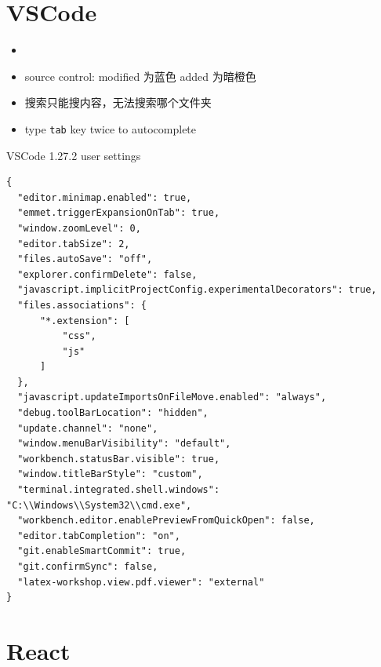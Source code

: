 \documentclass[a4paper, 12pt]{article}
\begin{document}
\section{VSCode}
\begin{itemize}

\item 

\item source control: modified 为蓝色 \quad added 为暗橙色

\item 搜索只能搜内容，无法搜索哪个文件夹

\item type \verb|tab| key twice to autocomplete
\end{itemize}

VSCode 1.27.2 user settings
\begin{verbatim}
{
  "editor.minimap.enabled": true,
  "emmet.triggerExpansionOnTab": true,
  "window.zoomLevel": 0,
  "editor.tabSize": 2,
  "files.autoSave": "off",
  "explorer.confirmDelete": false,
  "javascript.implicitProjectConfig.experimentalDecorators": true,
  "files.associations": {
      "*.extension": [
          "css",
          "js"
      ]
  },
  "javascript.updateImportsOnFileMove.enabled": "always",
  "debug.toolBarLocation": "hidden",
  "update.channel": "none",
  "window.menuBarVisibility": "default",
  "workbench.statusBar.visible": true,
  "window.titleBarStyle": "custom",
  "terminal.integrated.shell.windows": "C:\\Windows\\System32\\cmd.exe",
  "workbench.editor.enablePreviewFromQuickOpen": false,
  "editor.tabCompletion": "on",
  "git.enableSmartCommit": true,
  "git.confirmSync": false,
  "latex-workshop.view.pdf.viewer": "external"
}
\end{verbatim}


\section{React}
\end{document}
